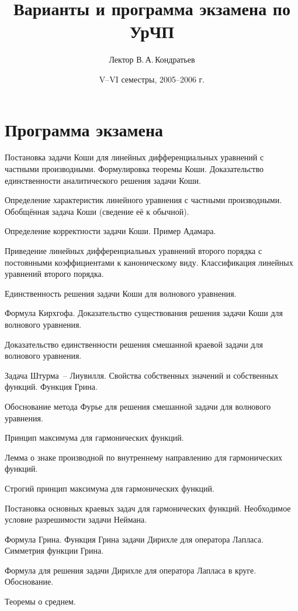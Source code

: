 \documentclass{article}
\title{Варианты и программа экзамена по УрЧП}
\author{Лектор В.\,А.\,Кондратьев}
\date{V--VI семестры, 2005--2006 г.}
\begin{document}
\maketitle

\section{Программа экзамена}

\begin{nums}{-3}
\item Постановка задачи Коши для линейных дифференциальных уравнений
с частными производными. Формулировка теоремы Коши. Доказательство
единственности аналитического решения задачи Коши.
\item Определение характеристик линейного уравнения с частными
производными. Обобщённая задача Коши (сведение её к обычной).
\item Определение корректности задачи Коши. Пример Адамара.
\item Приведение линейных дифференциальных уравнений второго порядка
с постоянными коэффициентами к каноническому виду. Классификация
линейных уравнений второго порядка.
\item Единственность решения задачи Коши для волнового уравнения.
\item Формула Кирхгофа. Доказательство существования решения задачи
Коши для волнового уравнения.
\item Доказательство единственности решения смешанной краевой задачи
для волнового уравнения.
\item Задача Штурма~-- Лиувилля. Свойства собственных значений и
собственных функций. Функция Грина.
\item Обоснование метода Фурье для решения смешанной задачи для
волнового уравнения.
\item Принцип максимума для гармонических функций.
\item Лемма о знаке производной по внутреннему направлению для
гармонических функций.
\item Строгий принцип максимума для гармонических функций.
\item Постановка основных краевых задач для гармонических функций.
Необходимое условие разрешимости задачи Неймана.
\item Формула Грина. Функция Грина задачи Дирихле для оператора
Лапласа. Симметрия функции Грина.
\item Формула для решения задачи Дирихле для оператора Лапласа в
круге. Обоснование.
\item Теоремы о среднем.

\end{nums}
\end{document}
